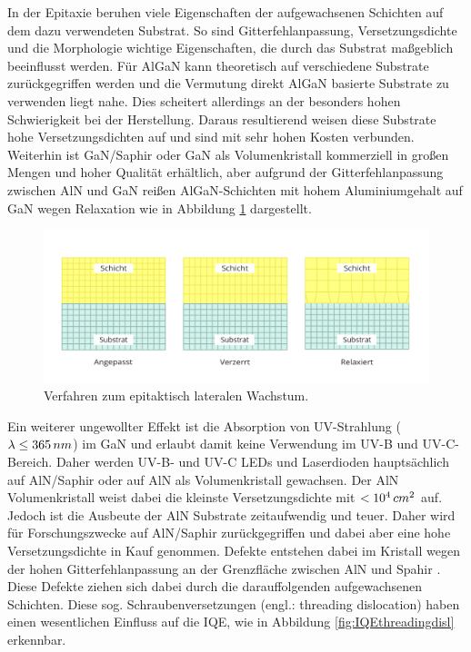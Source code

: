 In der Epitaxie beruhen viele Eigenschaften der aufgewachsenen Schichten auf dem dazu verwendeten Substrat. So sind Gitterfehlanpassung, Versetzungsdichte und die Morphologie wichtige Eigenschaften, die durch das Substrat maßgeblich beeinflusst werden. Für AlGaN kann theoretisch auf verschiedene Substrate zurückgegriffen werden und die Vermutung direkt AlGaN basierte Substrate zu verwenden liegt nahe. Dies scheitert allerdings an der besonders hohen Schwierigkeit bei der Herstellung. Daraus resultierend weisen diese Substrate hohe Versetzungsdichten auf und sind mit sehr hohen Kosten verbunden. Weiterhin ist GaN/Saphir oder GaN als Volumenkristall kommerziell in großen Mengen und hoher Qualität erhältlich, aber aufgrund der Gitterfehlanpassung zwischen AlN und GaN reißen AlGaN-Schichten mit hohem Aluminiumgehalt auf GaN wegen Relaxation \cite{problem} wie in Abbildung \ref{fig:wachstum} dargestellt.
\begin{figure}[h]
    \centering
    \begin{minipage}[t]{1\linewidth}
    \centering
    \includegraphics[width=1\linewidth]{Bilder/wachstumsarten.png}
    \end{minipage}%
    \caption{Verfahren zum epitaktisch lateralen Wachstum.}
     \label{fig:wachstum}
\end{figure} 
Ein weiterer ungewollter Effekt ist die Absorption von UV-Strahlung ($\lambda \leq 365 \thinspace nm$) im GaN und erlaubt damit keine Verwendung im UV-B und UV-C-Bereich. Daher werden UV-B- und UV-C LEDs und Laserdioden hauptsächlich auf AlN/Saphir oder auf AlN als Volumenkristall gewachsen. Der AlN Volumenkristall weist dabei die kleinste Versetzungsdichte mit $<10^4 \thinspace cm^2$ auf. Jedoch ist die Ausbeute der AlN Substrate zeitaufwendig und teuer. Daher wird für Forschungszwecke auf AlN/Saphir zurückgegriffen und dabei aber eine hohe Versetzungsdichte in Kauf genommen. Defekte entstehen dabei im Kristall wegen der hohen Gitterfehlanpassung an der Grenzfläche zwischen AlN und Spahir \cite{pohl}. Diese Defekte ziehen sich dabei durch die darauffolgenden aufgewachsenen Schichten. Diese sog. Schraubenversetzungen (engl.: threading dislocation) haben einen wesentlichen Einfluss auf die IQE, wie in Abbildung \ref{fig:IQEthreadingdisl} erkennbar. 
